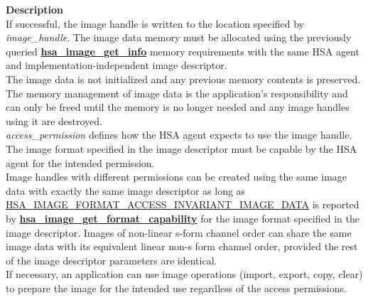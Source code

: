\documentclass[final]{book}
\newcommand{\reffun}[1]{\textbf{#1}}
\begin{document}
\begin{appendices}
\begin{longtable}{@{}>{\hangindent=2em}p{\linewidth}}
\end{longtable}
\vspace{-4mm}\noindent\textbf{Description}\\[1mm]
If successful, the image handle is written to the location specified by \textit{image_handle}. The image data memory must be allocated using the previously queried \hyperlink{group--images-1ga86abda7e50864b5537a209b12f40f030}{\reffun{hsa_image_get_info}} memory requirements with the same HSA agent and implementation-independent image descriptor.\\[2mm]
The image data is not initialized and any previous memory contents is preserved. The memory management of image data is the application's responsibility and can only be freed until the memory is no longer needed and any image handles using it are destroyed.\\[2mm]
\textit{access_permission} defines how the HSA agent expects to use the image handle. The image format specified in the image descriptor must be capable by the HSA agent for the intended permission.\\[2mm]
Image handles with different permissions can be created using the same image data with exactly the same image descriptor as long as \hyperlink{group--images-1ggab8be837beba5ecf84b757d5a5c1b80d5a8a70c7d8e7727e621217a246d38e4f0b}{HSA_IMAGE_FORMAT_ACCESS_INVARIANT_IMAGE_DATA} is reported by \hyperlink{group--images-1ga48e525e1be37d9ac4e4f6f6a422b3b11}{\reffun{hsa_image_get_format_capability}} for the image format specified in the image descriptor. Images of non-linear s-form channel order can share the same image data with its equivalent linear non-s form channel order, provided the rest of the image descriptor parameters are identical.\\[2mm]
If necessary, an application can use image operations (import, export, copy, clear) to prepare the image for the intended use regardless of the access permissions. 



\end{appendices}
\end{document}
